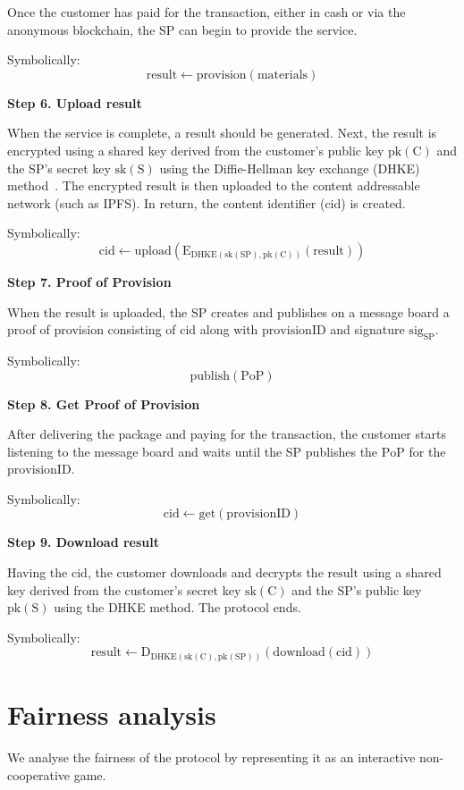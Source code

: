 \documentclass[pdftex,twocolumn,epjc3]{svjour3}
\begin{document}
{Once the customer has paid for the transaction, either in cash or via the anonymous blockchain, the SP can begin to provide the service.

Symbolically: 
\[
\mathrm{result \gets provision(materials)}
\]

\noindent \textbf
{Step 6. Upload result}\label{step-6-upload-result}

When the service is complete, a result should be generated. 
Next, the result is encrypted using a shared key derived from the customer's public key $\mathrm{pk(C)}$ and the SP's secret key $\mathrm{sk(S)}$ using the Diffie-Hellman key exchange (DHKE) method~\cite{diffieNewDirectionsCryptography1976}.
The encrypted result is then uploaded to the content addressable network (such as IPFS). In return, the content identifier ($\mathrm{cid}$) is created.

Symbolically: 
\[
\mathrm{cid \gets upload(E_{DHKE(sk(SP), pk(C))}(result))}
\]

\noindent \textbf
{Step 7. Proof of Provision}\label{step-7-proof-of-provision}

When the $\mathrm{result}$ is uploaded, the SP creates and publishes on a message board a proof of provision consisting of $\mathrm{cid}$ along with $\mathrm{provisionID}$ and signature $\mathrm{sig}_\mathrm{SP}$.

Symbolically: 
\[
\mathrm{publish(PoP)}
\]

\noindent \textbf
{Step 8. Get Proof of Provision}\label{step-8-get-proof-of-provision}

After delivering the package and paying for the transaction, the customer starts listening to the message board and waits until the SP publishes the $\mathrm{PoP}$ for the $\mathrm{provisionID}$.

Symbolically: 
\[
\mathrm{cid \gets get(provisionID)}
\]

\noindent \textbf
{Step 9. Download result}\label{step-9-download-result}

Having the $\mathrm{cid}$, the customer downloads and decrypts the $\mathrm{result}$ using a shared key derived from the customer's secret key $\mathrm{sk(C)}$ and the SP's public key $\mathrm{pk(S)}$ using the DHKE method. The protocol ends.

Symbolically: 
\[
\mathrm{result \gets D_{DHKE(sk(C), pk(SP))}(download(cid))}
\]

\section{Fairness analysis}\label{sec:fairness-analysis}
We analyse the fairness of the protocol by representing it as an interactive non-cooperative game.

}
\end{document}
